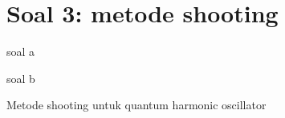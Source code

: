 \section{Soal 3: metode shooting}

soal a

soal b

Metode shooting untuk quantum harmonic oscillator
